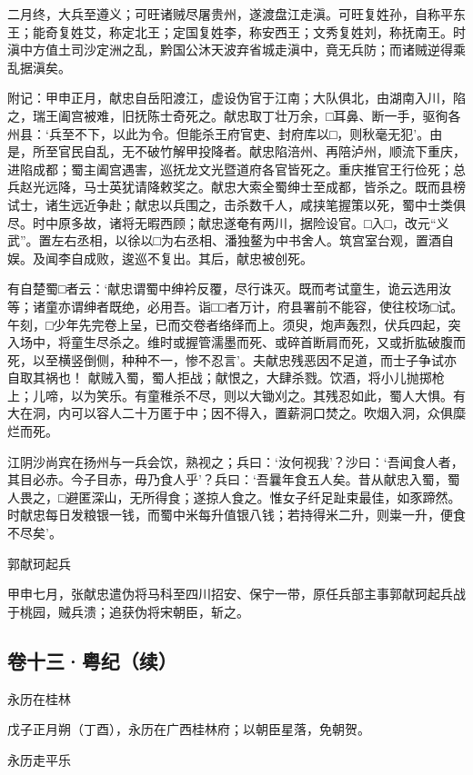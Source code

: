 \documentclass[]{article}
\begin{document}
二月终，大兵至遵义；可旺诸贼尽屠贵州，遂渡盘江走滇。可旺复姓孙，自称平东王；能奇复姓艾，称定北王；定国复姓李，称安西王；文秀复姓刘，称抚南王。时滇中方值土司沙定洲之乱，黔国公沐天波弃省城走滇中，竟无兵防；而诸贼逆得乘乱据滇矣。

附记：甲申正月，献忠自岳阳渡江，虚设伪官于江南；大队俱北，由湖南入川，陷之，瑞王阖宫被难，旧抚陈士奇死之。献忠取丁壮万余，□耳鼻、断一手，驱徇各州县：`兵至不下，以此为令。但能杀王府官吏、封府库以□，则秋毫无犯'。由是，所至官民自乱，无不破竹解甲投降者。献忠陷涪州、再陪泸州，顺流下重庆，进陷成都；蜀主阖宫遇害，巡抚龙文光暨道府各官皆死之。重庆推官王行俭死；总兵赵光远降，马士英犹请降敕奖之。献忠大索全蜀绅士至成都，皆杀之。既而县榜试士，诸生远近争赴；献忠以兵围之，击杀数千人，咸挟笔握策以死，蜀中士类俱尽。时中原多故，诸将无暇西顾；献忠遂奄有两川，据险设官。□入□，改元``义武''。置左右丞相，以徐以□为右丞相、潘独鳌为中书舍人。筑宫室台观，置酒自娱。及闻李自成败，逡巡不复出。其后，献忠被创死。

有自楚蜀□者云：`献忠谓蜀中绅衿反覆，尽行诛灭。既而考试童生，诡云选用汝等；诸童亦谓绅者既绝，必用吾。诣□□者万计，府县署前不能容，使往校场□试。午刻，□少年先完卷上呈，已而交卷者络绎而上。须臾，炮声轰烈，伏兵四起，突入场中，将童生尽杀之。维时或握管濡墨而死、或碎首断肩而死，又或折肱破腹而死，以至横竖倒侧，种种不一，惨不忍言'。夫献忠残恶因不足道，而士子争试亦自取其祸也！
献贼入蜀，蜀人拒战；献恨之，大肆杀戮。饮酒，将小儿抛掷枪上；儿啼，以为笑乐。有童稚杀不尽，则以大锄刈之。其残忍如此，蜀人大惧。有大在洞，内可以容人二十万匿于中；因不得入，置薪洞口焚之。吹烟入洞，众俱糜烂而死。

江阴沙尚宾在扬州与一兵会饮，熟视之；兵曰：`汝何视我'？沙曰：`吾闻食人者，其目必赤。今子目赤，毋乃食人乎'？兵曰：`吾曩年食五人矣。昔从献忠入蜀，蜀人畏之，□避匿深山，无所得食；遂掠人食之。惟女子纤足趾束最佳，如豕蹄然。时献忠每日发粮银一钱，而蜀中米每升值银八钱；若持得米二升，则粜一升，便食不尽矣'。

郭献珂起兵

甲申七月，张献忠遣伪将马科至四川招安、保宁一带，原任兵部主事郭献珂起兵战于桃园，贼兵溃；追获伪将宋朝臣，斩之。

\hypertarget{header-n77}{%
\subsection{卷十三·粤纪（续）}\label{header-n77}}

永历在桂林

戊子正月朔（丁酉），永历在广西桂林府；以朝臣星落，免朝贺。

永历走平乐
\end{document}
